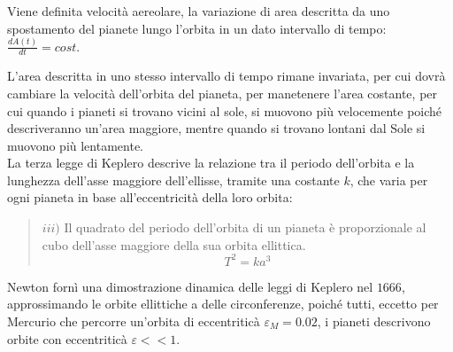 \documentclass{article}
\numberwithin{equation}{subsection}
\begin{document}
Viene definita velocità aereolare, la variazione di area descritta da uno spostamento del pianete lungo l'orbita in un dato intervallo di tempo: 
$\displaystyle\frac{dA(t)}{dt}=cost.$

\begin{center}
\end{center}

L'area descritta in uno stesso intervallo di tempo rimane invariata, per cui dovrà cambiare la velocità dell'orbita del pianeta, per manetenere l'area 
costante, per cui quando i pianeti si trovano vicini al sole, si muovono più velocemente poiché descriveranno un'area maggiore, mentre quando si 
trovano lontani dal Sole si muovono più lentamente. 
\\
La terza legge di Keplero descrive la relazione tra il periodo dell'orbita e la lunghezza dell'asse maggiore dell'ellisse, tramite una costante 
$k$, che varia per ogni pianeta in base all'eccentricità della loro orbita: 
\begin{quotation}
    $iii)$ Il quadrato del periodo dell'orbita di un pianeta è proporzionale al cubo dell'asse maggiore della sua orbita ellittica.
    \begin{equation}
        T^2=ka^3
    \end{equation}
\end{quotation}

Newton fornì una dimostrazione dinamica delle leggi di Keplero nel $1666$, approssimando le orbite ellittiche a delle circonferenze, poiché 
tutti, eccetto per Mercurio che percorre un'orbita di eccentriticà $\varepsilon_M=0.02$, i pianeti descrivono orbite con eccentriticà $\varepsilon<<1$. 

\begin{center}
\end{center}
\end{document}
